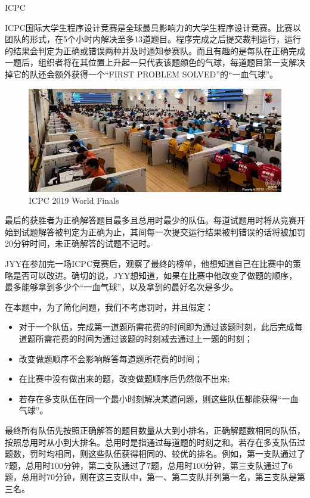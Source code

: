 \begin{Problem}{ICPC}{}

ICPC国际大学生程序设计竞赛是全球最具影响力的大学生程序设计竞赛。比赛以团队的形式，在5个小时内解决至多13道题目。程序完成之后提交裁判运行，运行的结果会判定为正确或错误两种并及时通知参赛队。而且有趣的是每队在正确完成一题后，组织者将在其位置上升起一只代表该题颜色的气球，每道题目第一支解决掉它的队还会额外获得一个“FIRST PROBLEM SOLVED”的“一血气球”。

\begin{figure}
\centering
\includegraphics{src/scoreboard/porto.jpg}
\caption{ICPC 2019 World Finals}
\end{figure}

最后的获胜者为正确解答题目最多且总用时最少的队伍。每道试题用时将从竞赛开始到试题解答被判定为正确为止，其间每一次提交运行结果被判错误的话将被加罚20分钟时间，未正确解答的试题不记时。

JYY在参加完一场ICPC竞赛后，观察了最终的榜单，他想知道自己在比赛中的策略是否可以改进。确切的说，JYY想知道，如果在比赛中他改变了做题的顺序，最多能够拿到多少个“一血气球”，以及拿到的最好名次是多少。

在本题中，为了简化问题，我们不考虑罚时，并且假定：
\begin{itemize}
\item 对于一个队伍，完成第一道题所需花费的时间即为通过该题时刻，此后完成每道题所需花费的时间为通过该题的时刻减去通过上一题的时刻；
\item 改变做题顺序不会影响解答每道题所花费的时间；
\item 在比赛中没有做出来的题，改变做题顺序后仍然做不出来;
\item 若存在多支队伍在同一个最小时刻解决某道问题，则这些队伍都能获得“一血气球”。
\end{itemize}

最终所有队伍先按照正确解答的题目数量从大到小排名，正确解题数相同的队伍，按照总用时从小到大排名。总用时是指通过每道题的时刻之和。若存在多支队伍过题数，罚时均相同，则这些队伍获得相同的、较优的排名。例如，第一支队通过了7题，总用时100分钟，第二支队通过了7题，总用时100分钟，第三支队通过了6题，总用时70分钟，则在这三支队中，第一、第二支队并列第一名，第三支队是第三名。


\end{Problem}

